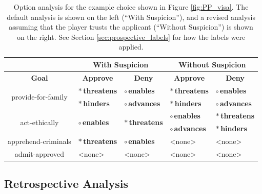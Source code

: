 \documentclass[arts,article,accept,moreauthors,pdftex,10pt,a4paper]{Definitions/mdpi}
\newcommand{\badsym}{$\ast$}
\newcommand{\goodsym}{$\circ$}
\newcommand{\none}{{\sffamily <none>}}
\newcommand{\ncemph}[1]{\textbf{\sffamily #1}}
\newcommand{\enables}{\ncemph{\color{enables}\goodsym{}\,enables}}
\newcommand{\advances}{\ncemph{\color{advances}\goodsym{}\,advances}}
\newcommand{\threatens}{\ncemph{\color{threatens}\badsym{}\,threatens}}
\newcommand{\hinders}{\ncemph{\color{hinders}\badsym{}\,hinders}}
\begin{document}
\begin{table}[H]
\centering
\begin{tabular}{c l l l l }
  \toprule
  & \multicolumn{2}{c}{\textbf{With Suspicion}} & \multicolumn{2}{c}{\textbf{Without Suspicion}} \\
  \midrule
  \textbf{Goal} & \multicolumn{1}{c}{\textbf{Approve}} & \multicolumn{1}{c}{\textbf{Deny}} & \multicolumn{1}{c}{\textbf{Approve}} & \multicolumn{1}{c}{\textbf{Deny}} \\
    \midrule
  \multirow{2}{9em}{\centering provide-for-family} & \threatens{} & \enables{} & \threatens{} & \enables{} \\
                                        & \hinders{} & \advances{} & \hinders{} & \advances{} \\
  \midrule
  \multirow{2}{9em}{\centering act-ethically} & \multirow{2}{6em}{\enables{}} & \multirow{2}{6em}{\threatens{}} & \enables{} & \threatens{} \\
  & & & \advances{} & \hinders{} \\
  \midrule
  apprehend-criminals & \threatens{} & \enables{} & \none{} & \none{} \\
  \midrule
  admit-approved & \none{} & \none{} & \none{} & \none{} \\
  \bottomrule
\end{tabular}
  \caption[\emph{Papers, Please} option analysis]{Option analysis for the example choice shown in Figure \ref{fig:PP_visa}. The default analysis is shown on the left (``With Suspicion''), and a revised analysis assuming that the player trusts the applicant (``Without Suspicion'') is shown on the right. See Section \ref{sec:prospective_labels} for how the labels were applied.}
\label{tab:PP_options}
\end{table}

\subsection{Retrospective Analysis}
\end{document}
